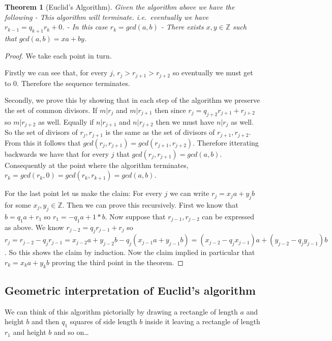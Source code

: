 \documentclass[
]{book}
\newtheorem{theorem}{Theorem}[chapter]
\theoremstyle{definition}
\theoremstyle{definition}
\theoremstyle{definition}
\theoremstyle{definition}
\theoremstyle{remark}
\begin{document}
\begin{theorem}[Euclid's Algorithm]
Given the algorithm above we have the following
- This algorithm will terminate. i.e.~eventually we have \(r_{k-1} = q_{k+1} r_{k} + 0\).
- In this case \(r_{k} = gcd(a,b)\)
- There exists \(x,y \in \mathbb{Z}\) such that \(gcd(a,b) = xa+by\).
\end{theorem}

\begin{proof}
We take each point in turn.

Firstly we can see that, for every \(j\), \(r_j> r_{j+1} > r_{j+2}\) so eventually we must get to 0. Therefore the sequence terminates.

Secondly, we prove this by showing that in each step of the algorithm we preserve the set of common divisors. If \(m|r_j\) and \(m|r_{j+1}\) then since \(r_j = q_{j+2}r_{j+1} + r_{j+2}\) so \(m|r_{j+2}\) as well. Equally if \(n|r_{j+1}\) and \(n|r_{j+2}\) then we must have \(n|r_j\) as well. So the set of divisors of \(r_j, r_{j+1}\) is the same as the set of divisors of \(r_{j+1},r_{j+2}\). From this it follows that \(gcd(r_j,r_{j+1})=gcd(r_{j+1},r_{j+2})\). Therefore itterating backwards we have that for every \(j\) that \(gcd(r_j, r_{j+1}) = gcd(a,b)\). Consequently at the point where the algorithm terminates, \(r_k = gcd(r_k,0)=gcd(r_k,r_{k+1})=gcd(a,b)\).

For the last point let us make the claim: For every \(j\) we can write \(r_j = x_j a + y_j b\) for some \(x_j, y_j \in \mathbb{Z}\). Then we can prove this recursively. First we know that \(b=q_1 a + r_1\) so \(r_1 = -q_1 a + 1*b\). Now suppose that \(r_{j-1}, r_{j-2}\) can be expressed as above. We know \(r_{j-2} = q_j r_{j-1} + r_j\) so \(r_j = r_{j-2} - q_j r_{j-1} = x_{j-2} a + y_{j-2} b - q_j(x_{j-1}a + y_{j-1}b) = (x_{j-2}-q_j x_{j-1})a + (y_{j-2} - q_j y_{j-1})b\). So this shows the claim by induction. Now the claim implied in particular that \(r_k = x_k a + y_k b\) proving the third point in the theorem.
\end{proof}

\subsection{Geometric interpretation of Euclid's algorithm}\label{geometric-interpretation-of-euclids-algorithm}

We can think of this algorithm pictorially by drawing a rectangle of length \(a\) and height \(b\) and then \(q_1\) squares of side length \(b\) inside it leaving a rectangle of length \(r_1\) and height \(b\) and so on\ldots{}
\end{document}
